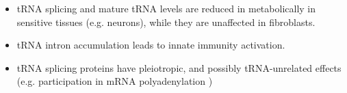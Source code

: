 \documentclass[12pt]{rockefeller}
\begin{document}
\begin{itemize}
\item tRNA splicing and mature tRNA levels are reduced in metabolically in sensitive tissues (e.g. neurons), while they are unaffected in fibroblasts.
\item tRNA intron accumulation leads to innate immunity activation.
\item tRNA splicing proteins have pleiotropic, and possibly tRNA-unrelated effects (e.g. participation in mRNA polyadenylation \cite{Paushkin:2004wl, Weitzer:2014bi})
\end{itemize}


\end{document}
